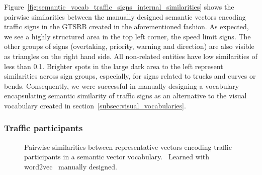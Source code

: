 Figure~\ref{fig:semantic_vocab_traffic_signs_internal_similarities} shows the pairwise similarities between the manually designed semantic vectors encoding traffic signs in the \ac{GTSRB} created in the aforementioned fashion.
As expected, we see a highly structured area in the top left corner, the speed limit signs.
The other groups of signs (overtaking, priority, warning and direction) are also visible as triangles on the right hand side.
All non-related entities have low similarities of less than \num{0.1}.
Brighter spots in the large dark area to the left represent similarities across sign groups, especially, for signs related to trucks and curves or bends.
Consequently, we were successful in manually designing a vocabulary encapsulating semantic similarity of traffic signs as an alternative to the visual vocabulary created in section~\ref{subsec:visual_vocabularies}.

\subsubsection{Traffic participants}%
\label{ssubsec:traffic_participants}

\begin{figure}[t]
    \centering
    \caption{Pairwise similarities between representative vectors encoding traffic participants in a semantic vector vocabulary.~\protect{} Learned with word2vec~\protect{} manually designed.}
    \label{fig:semantic_vocab_traffic_participants_internal_similarities}
\end{figure}

